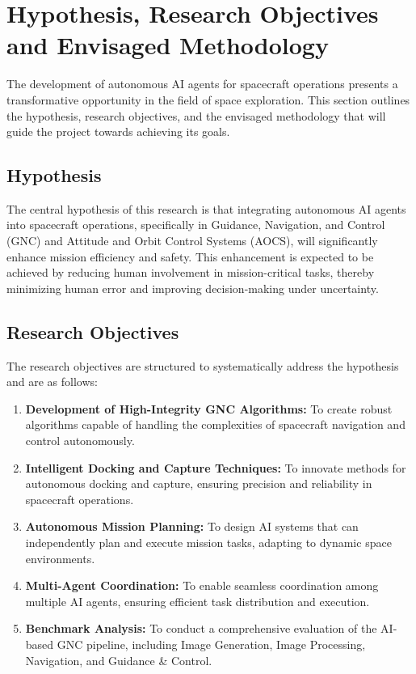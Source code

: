 \documentclass[a4paper, 11pt]{article}
\begin{document}
\section{Hypothesis, Research Objectives and Envisaged Methodology}

The development of autonomous AI agents for spacecraft operations presents a transformative opportunity in the field of space exploration. This section outlines the hypothesis, research objectives, and the envisaged methodology that will guide the project towards achieving its goals.

\subsection{Hypothesis}

The central hypothesis of this research is that integrating autonomous AI agents into spacecraft operations, specifically in Guidance, Navigation, and Control (GNC) and Attitude and Orbit Control Systems (AOCS), will significantly enhance mission efficiency and safety. This enhancement is expected to be achieved by reducing human involvement in mission-critical tasks, thereby minimizing human error and improving decision-making under uncertainty.

\subsection{Research Objectives}

The research objectives are structured to systematically address the hypothesis and are as follows:

\begin{enumerate}
    \item \textbf{Development of High-Integrity GNC Algorithms:} To create robust algorithms capable of handling the complexities of spacecraft navigation and control autonomously.
    \item \textbf{Intelligent Docking and Capture Techniques:} To innovate methods for autonomous docking and capture, ensuring precision and reliability in spacecraft operations.
    \item \textbf{Autonomous Mission Planning:} To design AI systems that can independently plan and execute mission tasks, adapting to dynamic space environments.
    \item \textbf{Multi-Agent Coordination:} To enable seamless coordination among multiple AI agents, ensuring efficient task distribution and execution.
    \item \textbf{Benchmark Analysis:} To conduct a comprehensive evaluation of the AI-based GNC pipeline, including Image Generation, Image Processing, Navigation, and Guidance & Control.
\end{enumerate}
\end{document}
